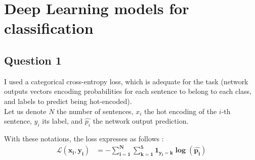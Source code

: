 \documentclass[11pt]{article}
\begin{document}
\section{Deep Learning models for classification}

\subsection*{Question 1}

I used a categorical cross-entropy loss, which is adequate for the task (network outputs vectors encoding probabilities for each sentence to belong to each class, and labels to predict being hot-encoded). \\

Let us denote $N$ the number of sentences, $x_i$ the hot encoding of the $i$-th sentence, $y_i$ its label, and $\hat{p_i}$ the network output prediction. 

With these notations, the loss expresses as follows :
\begin{align*}
   \mathbf{\mathcal{L}(x_i,y_i) }
                 & \mathbf{= - \sum_{i=1}^{N} \sum_{k=1}^{5} 1_{y_i=k} \log(\hat{p_i})}
\end{align*}
\newpage
\end{document}
